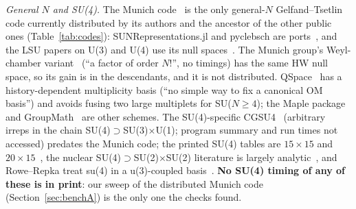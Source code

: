 \documentclass[11pt]{article}
\begin{document}
\emph{General $N$ and SU(4).}
The Munich code~\cite{munich} is the only general-$N$ Gelfand--Tsetlin code currently distributed by its authors and the ancestor of the other public ones (Table~\ref{tab:codes}): SUNRepresentations.jl and pyclebsch are ports~\cite{sunrep,pyclebsch}, and the LSU papers on U(3) and U(4) use its null spaces~\cite{dang}.
The Munich group's Weyl-chamber variant~\cite{everding} (``a factor of order $N!$'', no timings) has the same HW null space, so its gain is in the descendants, and it is not distributed.
QSpace~\cite{qspace} has a history-dependent multiplicity basis (``no simple way to fix a canonical OM basis'') and avoids fusing two large multiplets for SU($N\ge4$); the Maple package~\cite{gkt} and GroupMath~\cite{groupmath} are other schemes.
The SU(4)-specific CGSU4~\cite{cgsu4} (arbitrary irreps in the chain SU(4)$\supset$SU(3)$\times$U(1); program summary and run times not accessed) predates the Munich code; the printed SU(4) tables are $15\times15$ and $20\times15$~\cite{su4tables}, the nuclear SU(4)$\supset$SU(2)$\times$SU(2) literature is largely analytic~\cite{nuclear}, and Rowe--Repka treat su(4) in a u(3)-coupled basis~\cite{rr}.
\textbf{No SU(4) timing of any of these is in print}: our sweep of the distributed Munich code (Section~\ref{sec:benchA}) is the only one the checks found.
\end{document}
